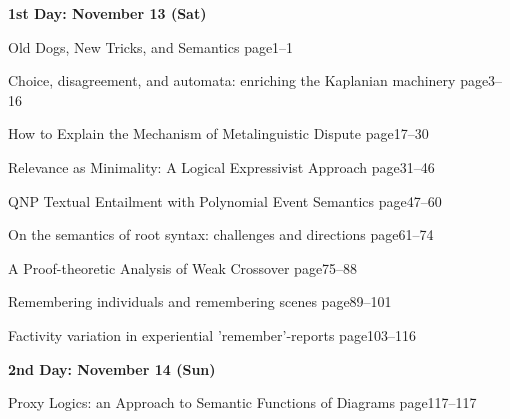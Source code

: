 \documentclass[12pt]{jarticle}
\begin{document}
\noindent\textbf{\large 
1st Day: November 13 (Sat)
}\\







  
     {Old Dogs, New Tricks, and Semantics}
     {page1--1}




  
     {Choice, disagreement, and automata: enriching the Kaplanian machinery}
     {page3--16}
  
     {How to Explain the Mechanism of Metalinguistic Dispute}
     {page17--30}
  
     {Relevance as Minimality: A Logical Expressivist Approach}
     {page31--46}




  
     {QNP Textual Entailment with Polynomial Event Semantics}
     {page47--60}
  
     {On the semantics of root syntax: challenges and directions}
     {page61--74}
  
     {A Proof-theoretic Analysis of Weak Crossover}
     {page75--88}




  
  
     {Remembering individuals and remembering scenes}
     {page89--101}
  
     {Factivity variation in experiential 'remember'-reports}
     {page103--116}




\noindent\textbf{\large 
2nd Day: November 14 (Sun)
}\\



  
     {Proxy Logics: an Approach to Semantic Functions of Diagrams}
     {page117--117}



\end{document}

